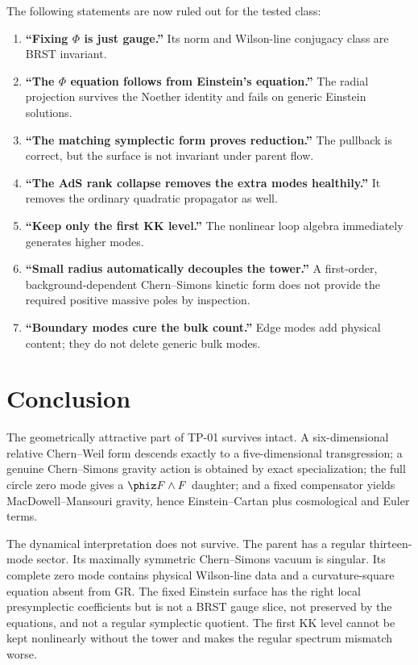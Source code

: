 The following statements are now ruled out for the tested class:
\begin{enumerate}
\item \textbf{``Fixing $\Phi$ is just gauge.''}  Its norm and Wilson-line conjugacy class are BRST invariant.
\item \textbf{``The $\Phi$ equation follows from Einstein's equation.''}  The radial projection survives the Noether identity and fails on generic Einstein solutions.
\item \textbf{``The matching symplectic form proves reduction.''}  The pullback is correct, but the surface is not invariant under parent flow.
\item \textbf{``The AdS rank collapse removes the extra modes healthily.''}  It removes the ordinary quadratic propagator as well.
\item \textbf{``Keep only the first KK level.''}  The nonlinear loop algebra immediately generates higher modes.
\item \textbf{``Small radius automatically decouples the tower.''}  A first-order, background-dependent Chern--Simons kinetic form does not provide the required positive massive poles by inspection.
\item \textbf{``Boundary modes cure the bulk count.''}  Edge modes add physical content; they do not delete generic bulk modes.
\end{enumerate}

\section{Conclusion}

The geometrically attractive part of TP-01 survives intact.  A six-dimensional relative Chern--Weil form descends exactly to a five-dimensional transgression; a genuine Chern--Simons gravity action is obtained by exact specialization; the full circle zero mode gives a $\phiz F\wedge F$ daughter; and a fixed compensator yields MacDowell--Mansouri gravity, hence Einstein--Cartan plus cosmological and Euler terms.

The dynamical interpretation does not survive.  The parent has a regular thirteen-mode sector.  Its maximally symmetric Chern--Simons vacuum is singular.  Its complete zero mode contains physical Wilson-line data and a curvature-square equation absent from GR.  The fixed Einstein surface has the right local presymplectic coefficients but is not a BRST gauge slice, not preserved by the equations, and not a regular symplectic quotient.  The first KK level cannot be kept nonlinearly without the tower and makes the regular spectrum mismatch worse.

